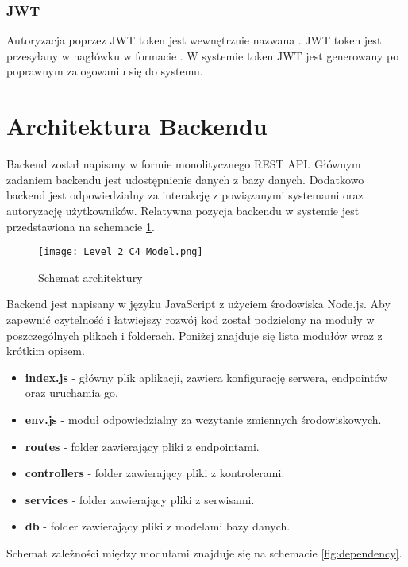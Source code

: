 \documentclass{documentation}
\begin{document}
\subsubsection{JWT}

Autoryzacja poprzez JWT token jest wewnętrznie nazwana .
JWT token jest przesyłany w nagłówku  w formacie .
W systemie token JWT jest generowany po poprawnym zalogowaniu się do systemu.

\section{Architektura Backendu}

Backend został napisany w formie monolitycznego REST API.
Głównym zadaniem backendu jest udostępnienie danych z bazy danych.
Dodatkowo backend jest odpowiedzialny za interakcję z powiązanymi systemami oraz autoryzację użytkowników.
Relatywna pozycja backendu w systemie jest przedstawiona na schemacie \ref{fig:arch}.

\begin{figure}[h]
    \centering
    \texttt{[image: Level\_2\_C4\_Model.png]}
    \caption{Schemat architektury\label{fig:arch}}
\end{figure}

Backend jest napisany w języku JavaScript z użyciem środowiska Node.js.
Aby zapewnić czytelność i łatwiejszy rozwój kod został podzielony na moduły w poszczególnych plikach i folderach.
Poniżej znajduje się lista modułów wraz z krótkim opisem.

\begin{itemize}
    \item \textbf{index.js} - główny plik aplikacji, zawiera konfigurację serwera, endpointów oraz uruchamia go.
    \item \textbf{env.js} - moduł odpowiedzialny za wczytanie zmiennych środowiskowych.
    \item \textbf{routes} - folder zawierający pliki z endpointami.
    \item \textbf{controllers} - folder zawierający pliki z kontrolerami.
    \item \textbf{services} - folder zawierający pliki z serwisami.
    \item \textbf{db} - folder zawierający pliki z modelami bazy danych.
\end{itemize}

Schemat zależności między modułami znajduje się na schemacie \ref{fig:dependency}.
\end{document}
